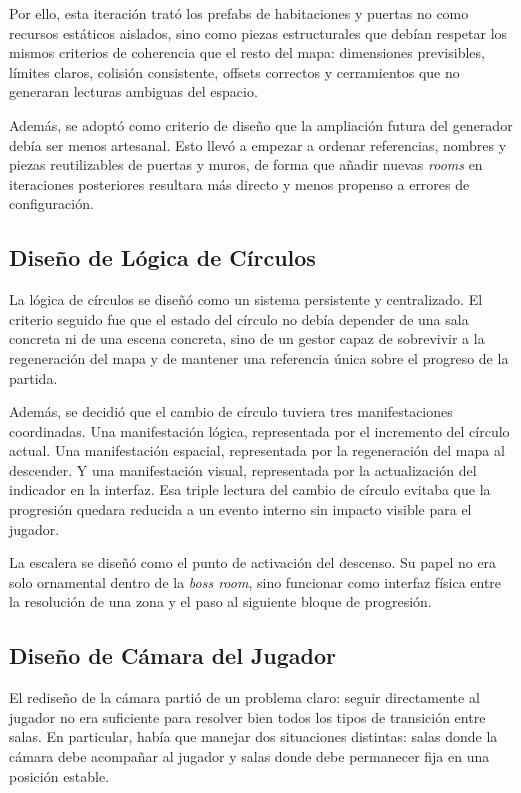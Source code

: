 Por ello, esta iteración trató los prefabs de habitaciones y puertas no como recursos
estáticos aislados, sino como piezas estructurales que debían respetar los mismos criterios
de coherencia que el resto del mapa: dimensiones previsibles, límites claros, colisión
consistente, offsets correctos y cerramientos que no generaran lecturas ambiguas del
espacio.

Además, se adoptó como criterio de diseño que la ampliación futura del generador debía ser
menos artesanal. Esto llevó a empezar a ordenar referencias, nombres y piezas reutilizables
de puertas y muros, de forma que añadir nuevas \textit{rooms} en iteraciones posteriores
resultara más directo y menos propenso a errores de configuración.

\subsection{Diseño de Lógica de Círculos}
La lógica de círculos se diseñó como un sistema persistente y centralizado. El criterio
seguido fue que el estado del círculo no debía depender de una sala concreta ni de una
escena concreta, sino de un gestor capaz de sobrevivir a la regeneración del mapa y de
mantener una referencia única sobre el progreso de la partida.

Además, se decidió que el cambio de círculo tuviera tres manifestaciones coordinadas. Una
manifestación lógica, representada por el incremento del círculo actual. Una manifestación
espacial, representada por la regeneración del mapa al descender. Y una manifestación
visual, representada por la actualización del indicador en la interfaz. Esa triple lectura
del cambio de círculo evitaba que la progresión quedara reducida a un evento interno sin
impacto visible para el jugador.

La escalera se diseñó como el punto de activación del descenso. Su papel no era solo
ornamental dentro de la \textit{boss room}, sino funcionar como interfaz física entre la
resolución de una zona y el paso al siguiente bloque de progresión.

\subsection{Diseño de Cámara del Jugador}
El rediseño de la cámara partió de un problema claro: seguir directamente al jugador no era
suficiente para resolver bien todos los tipos de transición entre salas. En particular,
había que manejar dos situaciones distintas: salas donde la cámara debe acompañar al
jugador y salas donde debe permanecer fija en una posición estable.

